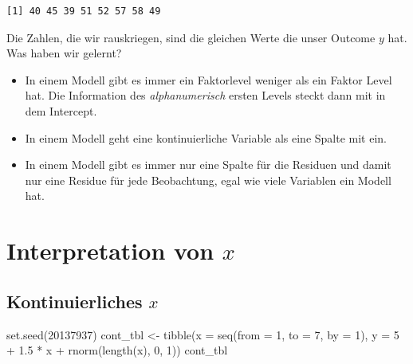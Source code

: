 \documentclass[
  letterpaper,
]{scrbook}
\newenvironment{Shaded}{\begin{snugshade}}{\end{snugshade}}
\newcommand{\AttributeTok}[1]{\textcolor[rgb]{0.40,0.45,0.13}{#1}}
\newcommand{\DecValTok}[1]{\textcolor[rgb]{0.68,0.00,0.00}{#1}}
\newcommand{\FloatTok}[1]{\textcolor[rgb]{0.68,0.00,0.00}{#1}}
\newcommand{\FunctionTok}[1]{\textcolor[rgb]{0.28,0.35,0.67}{#1}}
\newcommand{\NormalTok}[1]{\textcolor[rgb]{0.00,0.23,0.31}{#1}}
\newcommand{\OtherTok}[1]{\textcolor[rgb]{0.00,0.23,0.31}{#1}}
\newcommand{\SpecialCharTok}[1]{\textcolor[rgb]{0.37,0.37,0.37}{#1}}
\providecommand{\tightlist}{%
  \setlength{\itemsep}{0pt}\setlength{\parskip}{0pt}}\usepackage{longtable,booktabs,array}
\begin{document}
\begin{verbatim}
[1] 40 45 39 51 52 57 58 49
\end{verbatim}

Die Zahlen, die wir rauskriegen, sind die gleichen Werte die unser
Outcome \(y\) hat. Was haben wir gelernt?

\begin{itemize}
\tightlist
\item
  In einem Modell gibt es immer ein Faktorlevel weniger als ein Faktor
  Level hat. Die Information des \emph{alphanumerisch} ersten Levels
  steckt dann mit in dem Intercept.
\item
  In einem Modell geht eine kontinuierliche Variable als eine Spalte mit
  ein.
\item
  In einem Modell gibt es immer nur eine Spalte für die Residuen und
  damit nur eine Residue für jede Beobachtung, egal wie viele Variablen
  ein Modell hat.
\end{itemize}

\hypertarget{sec-interpret-x}{%
\section{\texorpdfstring{Interpretation von
\(x\)}{Interpretation von x}}\label{sec-interpret-x}}

\hypertarget{sec-interpret-x-cont}{%
\subsection{\texorpdfstring{Kontinuierliches
\(x\)}{Kontinuierliches x}}\label{sec-interpret-x-cont}}

\begin{Shaded}
\begin{Highlighting}[]
\FunctionTok{set.seed}\NormalTok{(}\DecValTok{20137937}\NormalTok{)}
\NormalTok{cont\_tbl }\OtherTok{\textless{}{-}} \FunctionTok{tibble}\NormalTok{(}\AttributeTok{x =} \FunctionTok{seq}\NormalTok{(}\AttributeTok{from =} \DecValTok{1}\NormalTok{, }\AttributeTok{to =} \DecValTok{7}\NormalTok{, }\AttributeTok{by =} \DecValTok{1}\NormalTok{),}
                   \AttributeTok{y =} \DecValTok{5} \SpecialCharTok{+} \FloatTok{1.5} \SpecialCharTok{*}\NormalTok{ x }\SpecialCharTok{+} \FunctionTok{rnorm}\NormalTok{(}\FunctionTok{length}\NormalTok{(x), }\DecValTok{0}\NormalTok{, }\DecValTok{1}\NormalTok{))}
\NormalTok{cont\_tbl}
\end{Highlighting}
\end{Shaded}
\end{document}
